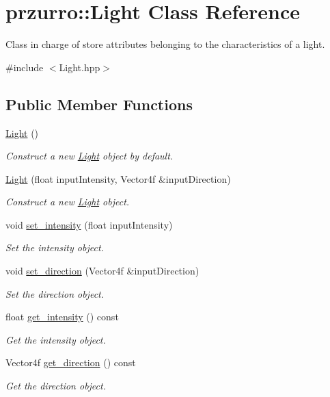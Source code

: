 \hypertarget{classprzurro_1_1_light}{}\section{przurro\+::Light Class Reference}
\label{classprzurro_1_1_light}


Class in charge of store attributes belonging to the characteristics of a light.  




{\ttfamily \#include $<$Light.\+hpp$>$}

\subsection*{Public Member Functions}
\begin{DoxyCompactItemize}
\item 
\mbox{\hyperlink{classprzurro_1_1_light_afaa4607772985f64464daffe7d96cf37}{Light}} ()
\begin{DoxyCompactList}\small\item\em Construct a new \mbox{\hyperlink{classprzurro_1_1_light}{Light}} object by default. \end{DoxyCompactList}\item 
\mbox{\hyperlink{classprzurro_1_1_light_ad3a1fde2bf9a6cd0a58523e6592480e5}{Light}} (float input\+Intensity, Vector4f \&input\+Direction)
\begin{DoxyCompactList}\small\item\em Construct a new \mbox{\hyperlink{classprzurro_1_1_light}{Light}} object. \end{DoxyCompactList}\item 
void \mbox{\hyperlink{classprzurro_1_1_light_a9e0fd0796b5c829ed444bebfd85f6562}{set\+\_\+intensity}} (float input\+Intensity)
\begin{DoxyCompactList}\small\item\em Set the intensity object. \end{DoxyCompactList}\item 
void \mbox{\hyperlink{classprzurro_1_1_light_a73eb057d6e27c0480bed85545141125f}{set\+\_\+direction}} (Vector4f \&input\+Direction)
\begin{DoxyCompactList}\small\item\em Set the direction object. \end{DoxyCompactList}\item 
float \mbox{\hyperlink{classprzurro_1_1_light_a2e044cf45455887892b46ff1263e4a45}{get\+\_\+intensity}} () const
\begin{DoxyCompactList}\small\item\em Get the intensity object. \end{DoxyCompactList}\item 
Vector4f \mbox{\hyperlink{classprzurro_1_1_light_a0fd4b65685aea10cff7e7523c42cc573}{get\+\_\+direction}} () const
\begin{DoxyCompactList}\small\item\em Get the direction object. \end{DoxyCompactList}\end{DoxyCompactItemize}


